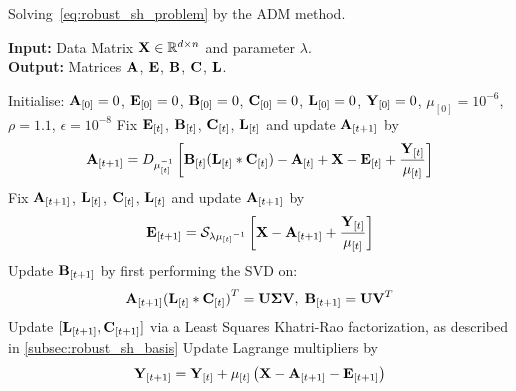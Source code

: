 \begin{algorithm}[t]
    \caption{Solving~\eqref{eq:robust_sh_problem} by the ADM method.}
\label{alg:adm_solution}
    {\scriptsize\textbf{Input:} Data Matrix $\boldsymbol{\mathbf{X}} \in \mathbb{R}^{d \times n}$ and parameter $\lambda$.} \\
    {\scriptsize\textbf{Output:} Matrices $\boldsymbol{\mathbf{A}}$, $\boldsymbol{\mathbf{E}}$, $\boldsymbol{\mathbf{B}}$, $\boldsymbol{\mathbf{C}}$, $\boldsymbol{\mathbf{L}}$.}  \\
{
    \scriptsize
    \def\At{{\bb{A}_{[t]}}}
    \def\Et{{\bb{E}_{[t]}}}
    \def\Ct{{\bb{C}_{[t]}}}
    \def\Lt{{\bb{L}_{[t]}}}
    \def\Bt{{\bb{B}_{[t]}}}
    \def\Yt{{\bb{Y}_{[t]}}}
    \def\mut{{\mu_{[t]}}}
    \def\X{{\bb{X}}}
    
    \begin{algorithmic}
        \State{}Initialise: $\boldsymbol{\mathbf{A}}_{[0]} = 0$, $\boldsymbol{\mathbf{E}}_{[0]} = 0$, $\boldsymbol{\mathbf{B}}_{[0]} = 0$, $\boldsymbol{\mathbf{C}}_{[0]} = 0$, $\boldsymbol{\mathbf{L}}_{[0]} = 0$, $\boldsymbol{\mathbf{Y}}_{[0]} = 0$, $\mu_{[0]} = 10^{-6}$, $\rho = 1.1$, $\epsilon = 10^{-8}$
            \State{}Fix $\Et$, $\Bt$, $\Ct$, $\Lt$ and update $\boldsymbol{\mathbf{A}}_{[t + 1]}$ by
                \begin{equation}\label{eq:A_update}
                    \bb{A}_{[t+1]} = D_{\mu_{[t]}^{-1}} \left[  \Bt ( \Lt \ast \Ct ) - \At + \X - \Et + \frac{\Yt}{\mut} \right]
                \end{equation}
            \State{}Fix $\boldsymbol{\mathbf{A}}_{[t+1]}$, $\Lt$, $\Ct$, $\Lt$ and update $\boldsymbol{\mathbf{A}}_{[t + 1]}$ by
                \begin{equation}\label{eq:E_update}
                    \bb{E}_{[t+1]} = \mathcal{S}_{\lambda \mut^{-1}} \left[ \X - \bb{A}_{[t+1]} + \frac{\Yt}{\mut} \right]
                \end{equation}
            \State{}Update $\boldsymbol{\mathbf{B}}_{[t+1]}$ by first performing the SVD on:
                \begin{equation}\label{eq:ALC_svd}
                    \bb{A}_{[t+1]} {(\Lt \ast \Ct)}^T = \bb{U} \bb{\Sigma} \bb{V}, \; \bb{B}_{[t+1]} = \bb{U} \bb{V}^T
                \end{equation}
            \State{}Update $[\boldsymbol{\mathbf{L}}_{[t+1]}, \boldsymbol{\mathbf{C}}_{[t+1]}]$ via a Least Squares Khatri-Rao factorization, as described in \cref{subsec:robust_sh_basis}
            \State{} Update Lagrange multipliers by
                \begin{equation}\label{eq:Y_update}
                    \bb{Y}_{[t+1]} = \Yt + \mut \left( \X - \bb{A}_{[t+1]} - \bb{E}_{[t+1]} \right)

\end{equation}
\end{algorithmic}}
\end{algorithm}
